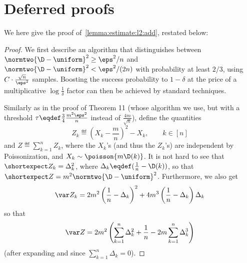 \chapter{Deferred proofs}\label{app:deferred:proofs}

We here give the proof of~\cref{lemma:estimate:l2:add}, restated below:
\lemmaestimateltwoadd*
\begin{proof}
We first describe an algorithm that distinguishes between $\normtwo{\D-\uniform}^2 \geq \eps^2/{n}$ and $\normtwo{\D-\uniform}^2 < \eps^2/(2n)$ with probability at least $2/3$, using $C\cdot\frac{\sqrt{n}}{\eps^2}$ samples. Boosting the success probability to $1-\delta$ at the price of a multiplicative $\log\frac{1}{\delta}$ factor can then be achieved by standard techniques.

Similarly as in the proof of Theorem 11 (whose algorithm we use, but with a threshold $\tau\eqdef \frac{3}{4}\frac{m^2\eps^2}{n}$ instead of $\frac{4m}{\sqrt{n}}$), define the quantities
\[
Z_k \eqdef \left(X_k-\frac{m}{n}\right)^2 - X_k,\qquad k\in[n]
\]
and $Z\eqdef\sum_{k=1}^n Z_k$, where the $X_k$'s (and thus the $Z_k$'s) are independent by Poissonization, and $X_k\sim\poisson{m \D(k)}$. It is not hard to see that $\shortexpect Z_k = \Delta_k^2$, where $\Delta_k\eqdef (\frac{1}{n}-\D(k))$, so that $\shortexpect Z = m^2\normtwo{\D-\uniform}^2$. Furthermore, we also get
\[
  \var Z_k = 2m^2\left(\frac{1}{n}-\Delta_k\right)^2 + 4m^3\left(\frac{1}{n}-\Delta_k\right)\Delta_k
\]
so that
\begin{equation}\label{eq:estimate:l2:add:variance}
  \var Z = 2m^2\left( \sum_{k=1}^n \Delta_k^2 + \frac{1}{n} -2 m\sum_{k=1}^n \Delta_k^3\right)
\end{equation}
(after expanding and since $\sum_{k=1}^n \Delta_k = 0$).


\end{proof}
